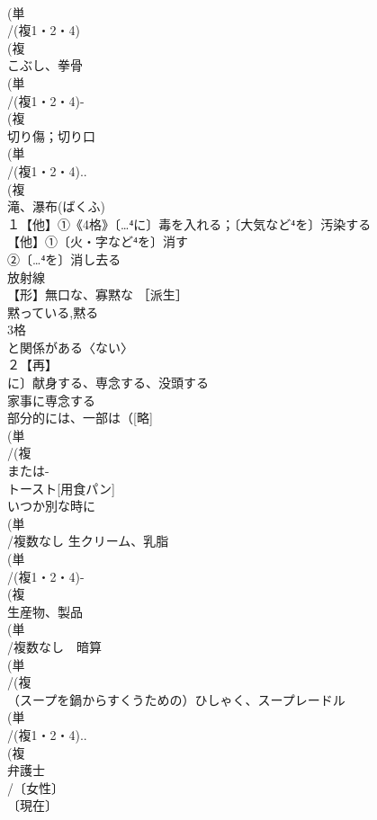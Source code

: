 \documentclass[8pt]{extreport}
\begin{document}
\begin{CJK}{UTF8}{min}
\\	(単
\\	/(複1・2・4)
\\	(複
\\	こぶし、拳骨 
\\	(単
\\	/(複1・2・4)-
\\	(複
\\	切り傷；切り口
\\	(単
\\	/(複1・2・4)..
\\	(複
\\	滝、瀑布(ばくふ) 
\\	１【他】①《4格》〔…⁴に〕毒を入れる；〔大気など⁴を〕汚染する 
\\	【他】①〔火・字など⁴を〕消す 
\\	②〔…⁴を〕消し去る
\\	放射線 
\\	【形】無口な、寡黙な ［派生］ 
\\	黙っている,黙る
\\	3格 
\\	と関係がある〈ない〉
\\	２【再】
\\	に〕献身する、専念する、没頭する 
\\	家事に専念する
\\	部分的には、一部は（[略]
\\	(単
\\	/(複
\\	または-
\\	トースト[用食パン] 
\\	いつか別な時に
\\	(単
\\	/複数なし 生クリーム、乳脂 
\\	(単
\\	/(複1・2・4)-
\\	(複
\\	生産物、製品 
\\	(単
\\	/複数なし　暗算 
\\	(単
\\	/(複
\\	（スープを鍋からすくうための）ひしゃく、スープレードル 
\\	(単
\\	/(複1・2・4)..
\\	(複
\\	弁護士 
\\	/〔女性〕
\\	〔現在〕

\end{CJK}
\end{document}
